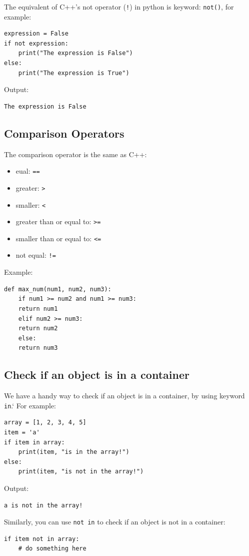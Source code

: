 \documentclass[12pt]{book}
\begin{document}
The equivalent of C++'s not operator (\texttt{!}) in python is keyword: \texttt{not()}, for example:
\begin{verbatim}
expression = False
if not expression:
    print("The expression is False")
else:
    print("The expression is True")
\end{verbatim}
Output:
\begin{verbatim}
The expression is False
\end{verbatim}
\subsection{Comparison Operators}
\label{sec:org164bf64}
The comparison operator is the same as C++:
\begin{itemize}
\item eual: \texttt{==}
\item greater: \texttt{>}
\item smaller: \texttt{<}
\item greater than or equal to: \texttt{>=}
\item smaller than or equal to: \texttt{<=}
\item not equal: \texttt{!=}
\end{itemize}

Example:
\begin{verbatim}
def max_num(num1, num2, num3):
    if num1 >= num2 and num1 >= num3:
	return num1
    elif num2 >= num3:
	return num2
    else:
	return num3
\end{verbatim}
\subsection{Check if an object is in a container}
\label{sec:org3326b9f}
We have a handy way to check if an object is in a container, by using keyword \texttt{in}.` For example:
\begin{verbatim}
array = [1, 2, 3, 4, 5]
item = 'a'
if item in array:
    print(item, "is in the array!")
else:
    print(item, "is not in the array!")
\end{verbatim}
Output:
\begin{verbatim}
a is not in the array!
\end{verbatim}

Similarly, you can use \texttt{not in} to check if an object is not in a container:
\begin{verbatim}
if item not in array:
    # do something here
\end{verbatim}
\end{document}
